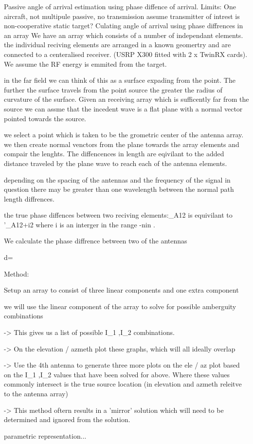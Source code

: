 Passive angle of arrival estimation using phase diffence of arrival.
Limits:
One aircraft, not multipule
passive, no transmission
assume transmitter of intrest is non-cooperative
static target?
Culating angle of arrival using phase diffrences in an array
We have an array which consists of a number of independant elements. the individual reciving elements are arranged in a known geomertry and are connected to a centeralised receiver. (USRP X300 fitted with 2 x TwinRX cards).
We assume the RF energy is emmited from the target.

in the far field we can think of this as a surface expading from the point. The further the surface travels from the point source the greater the radius of curvature of the surface. Given an receiving array which is sufficently far from the source we can assme that the incedent wave is a flat plane with a normal vector pointed towards the source.

we select a point which is taken to be the grometric center of the antenna array. we then create normal venctors from the plane towards the array elements and compair the lenghts. The diffencences in length are eqivilant to the added distance traveled by the plane wave to reach each of the antenna elements.

depending on the spacing of the antennas and the frequency of the signal in question there may be greater than one wavelength between the normal path length diffrences.

the true phase diffences between two reciving elements:\triangle\phi{}_{A12}
  is equivilant to \triangle\phi'{}_{A12}+i2\pi
  where i
  is an interger in the range -n\leq i\leq n
 .

We calculate the phase diffrence between two of the antennas

d=
 

Method:

Setup an array to consist of three linear components and one extra component

we will use the linear component of the array to solve for possible amberguity combinations

-> This gives us a list of possible I_{1}
 ,I_{2}
  combinations.

-> On the elevation / azmeth plot these graphs, which will all ideally overlap

-> Use the 4th antenna to generate three more plots on the ele / az plot based on the I_{1}
 ,I_{2}
 values that have been solved for above. Where these values commonly intersect is the true source location (in elevation and azmeth releitve to the antenna array)

-> This method oftern results in a 'mirror' solution which will need to be determined and ignored from the solution.

parametric representation...